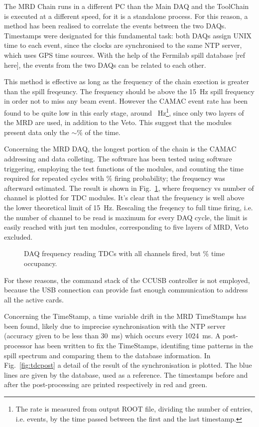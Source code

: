 The MRD Chain runs in a different PC than the Main DAQ and the ToolChain %
is executed at a different speed, for it is a standalone process.
For this reason, a method has been realised to correlate the events between the two DAQs.
Timestamps were designated for this fundamental task: both DAQs assign UNIX time to each event, since %
the clocks are synchronised to the same NTP server, which uses GPS time sources.
With the help of the Fermilab spill database [ref here], the events from the two DAQs can be related %
to each other.

This method is effective as long as the frequency of the chain exection is greater than the %
spill freqeuncy.
The frequency should be above the 15~Hz spill frequency in order not to miss any beam event.
However the CAMAC event rate has been found to be quite low in this %
early stage, around ~Hz\footnote{The rate is measured from output ROOT file, dividing %
  the number of entries, i.e. events, by the time passed between the first and the last timestamp.}, %
since only two layers of the MRD are used, in addition to the Veto.
This suggest that the modules present data only the $\sim$\% of the time.

Concerning the MRD DAQ, the longest portion of the chain is the CAMAC addressing and data colleting.
The software has been tested using software triggering, employing the test functions of the modules, %
and counting the time required for  repeated cycles with \% firing probability; %
the frequency was afterward estimated.
The result is shown in Fig.~\ref{fig:tdcfreq}, where frequency vs number of channel is %
plotted for TDC modules.
It's clear that the frequency is well above the lower theoretical limit of 15~Hz.
Rescaling the freqency to full time firing, i.e. the number of channel to be read is maximum %
for every DAQ cycle, the limit is easily reached with just ten modules, corresponding %
to five layers of MRD, Veto excluded.

\begin{figure}
  \centering
    
    \caption{DAQ frequency reading TDCs with all channels fired, but \% time occupancy.}
  \label{fig:tdcfreq}
\end{figure}

For these reasons, the command stack of the CCUSB controller is not employed, %
because the USB connection can provide fast enough communication to address all the active cards.

Concerning the TimeStamp, a time variable drift in the MRD TimeStamps has been found, %
likely due to imprecise synchronisation with the NTP server %
(accuracy given to be less than 30~ms) which occurs every 1024~ms. 
A post-processor has been written to fix the TimeStamps, identifing time patterns in the %
spill spectrum and comparing them to the database information.
In Fig.~\ref{fig:tdcpost} a detail of the result of the synchronisation is plotted.
The blue lines are given by the database, used as a reference.
The timestamps before and after the post-processing are printed respectively in red and green.

